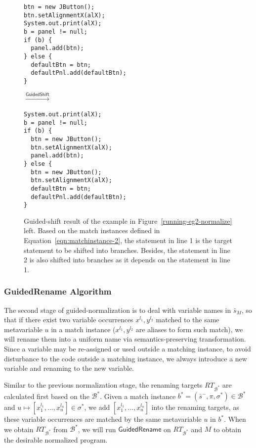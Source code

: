 \documentclass[a4paper, USenglish]{lipics-v2016}
\newenvironment{smpage}[1]
{\begin{lrbox}{\fmbox}\begin{minipage}{#1}}
{\end{minipage}\end{lrbox}\usebox{\fmbox}}
\theoremstyle{plain}
\begin{document}
\begin{figure}[ht]
\begin{center}
\begin{smpage}{0.34\columnwidth}
\begin{lstlisting}[style=patl,frame=none,basicstyle=\ttfamily\scriptsize]
btn = new JButton();
btn.setAlignmentX(alX);
System.out.print(alX);
b = panel != null;
if (b) {
  panel.add(btn);
} else {
  defaultBtn = btn;
  defaultPnl.add(defaultBtn);
}
\end{lstlisting}
\end{smpage}
\!\!\!\!\!\!$\xrightarrow{\mathsf{GuidedShift}}$~~~~~
\begin{smpage}{0.4\columnwidth}
\begin{lstlisting}[style=patl,frame=none,basicstyle=\ttfamily\scriptsize]
System.out.print(alX);
b = panel != null;
if (b) {
  btn = new JButton();
  btn.setAlignmentX(alX);
  panel.add(btn);
} else {
  btn = new JButton();
  btn.setAlignmentX(alX);
  defaultBtn = btn;
  defaultPnl.add(defaultBtn);
}
\end{lstlisting}
\end{smpage}
\end{center}
\caption{Guided-shift result of the example in Figure~\ref{running-eg2-normalize} left. Based on the match instances defined in Equation~\ref{eqn:matchinstance-2}, the statement in line 1 is the target statement to be shifted into branches. Besides, the statement in line 2 is also shifted into branches as it depends on the statement in line 1.}
\label{running-eg2-shift}
\end{figure}

\subsubsection{GuidedRename Algorithm}

The second stage of guided-normalization is to deal with variable
names in $\bar{s}_M$, so that if there exist two variable occurrences
$x^{l_1}, y^{l_2}$ matched to the same metavariable $u$ in a match
instance ($x^{l_1},y^{l_2}$ are aliases to form such match), we will
rename them into a uniform name via semantics-preserving
transformation. Since a variable may be re-assigned or
used outside a matching instance, to avoid disturbance to the code outside a matching instance, we always introduce a new variable and renaming to the new variable.

Similar to the previous normalization stage, the renaming targets
$\mathit{RT}_{\mathcal{B}^{*}}$ are calculated first based on the
$\mathcal{B}^{*}$. Given a match instance
$b^*=(\bar{s}^-,\pi,\sigma^*)\in \mathcal{B}^*$ and  $u\mapsto[x^{l_1}_{1},...,x^{l_n}_{n}]\in\sigma^{*}$, we add $[x^{l_1}_1,...,x^{l_n}_n]$ into the renaming targets, as these variable occurrences are matched by the same metavariable $u$ in $b^*$. When we obtain $\mathit{RT}_{\mathcal{B}^*}$ from $\mathcal{B}^*$, we will run $\mathsf{GuidedRename}$ on $\mathit{RT}_{\mathcal{B}^*}$ and $M$ to obtain the desirable normalized program.
\end{document}
